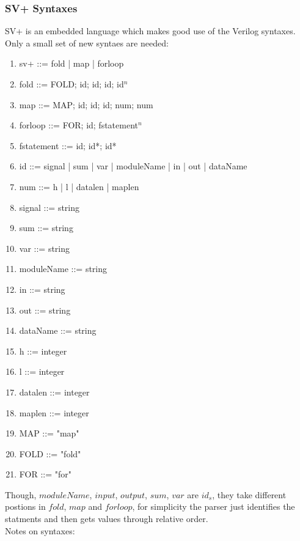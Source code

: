 \subsubsection{SV+ Syntaxes}
SV+ is an embedded language which makes good use of the Verilog syntaxes. Only a small set of new syntaes are needed:
\itshape
\begin{enumerate}\itemsep2pt \parskip0pt 
  \item sv+ ::= fold | map | forloop
  \item fold ::= FOLD; id; id; id; id$^n$
  \item map ::= MAP; id; id; id; num; num
  \item forloop ::= FOR; id; fstatement$^n$
  \item fstatement ::= id; id*; id*
  \item id ::= signal | sum | var | moduleName | in
               | out | dataName
  \item num ::= h | l | datalen | maplen
  \item signal ::= string
  \item sum ::= string
  \item var ::= string
  \item moduleName ::= string
  \item in ::=  string
  \item out ::= string
  \item dataName ::= string
  \item h ::= integer
  \item l ::= integer
  \item datalen ::= integer
  \item maplen ::= integer
  \item MAP ::= "map"
  \item FOLD ::= "fold"
  \item FOR ::= "for"
\end{enumerate}
\normalfont
Though, $moduleName$, $input$, $output$, $sum$, $var$ are $id_s$, they take different postions in $fold$, $map$ and $forloop$, for simplicity the parser just identifies the statments and then gets values through relative order.\\
Notes on syntaxes:
